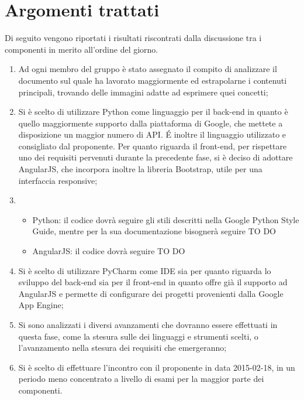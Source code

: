 %



\section{Argomenti trattati} %
\label{sec:argomenti_trattati}
Di seguito vengono riportati i risultati riscontrati dalla discussione tra i componenti in merito all'ordine del giorno.
	\begin{enumerate}
		\item Ad ogni membro del gruppo è stato assegnato il compito di analizzare il documento sul quale ha lavorato maggiormente ed estrapolarne i contenuti principali, trovando delle immagini adatte ad esprimere quei concetti;
		\item Si è scelto di utilizzare Python come linguaggio per il back-end in quanto è quello maggiormente supporto dalla piattaforma di Google, che mettete a disposizione un maggior numero di API. \'E inoltre il linguaggio utilizzato e consigliato dal proponente. \newline
		Per quanto riguarda il front-end, per rispettare uno dei requisiti pervenuti durante la precedente fase, si è deciso di adottare AngularJS, che incorpora inoltre la libreria Bootstrap, utile per una interfaccia responsive;
		\item 
			\begin{itemize}
				\item Python: il codice dovrà seguire gli stili descritti nella Google Python Style Guide, mentre per la sua documentazione bisognerà seguire TO DO 
				\item AngularJS: il codice dovrà seguire TO DO
			\end{itemize}
		\item Si è scelto di utilizzare PyCharm come IDE sia per quanto riguarda lo sviluppo del back-end sia per il front-end in quanto offre già il supporto ad AngularJS e permette di configurare dei progetti provenienti dalla Google App Engine;
		\item Si sono analizzati i diversi avanzamenti che dovranno essere effettuati in questa fase, come la stesura sulle \docNameVersionNdP{} dei linguaggi e strumenti scelti, o l'avanzamento nella stesura dei requisiti che emergeranno;
		\item Si è scelto di effettuare l'incontro con il proponente in data 2015-02-18, in un periodo meno concentrato a livello di esami per la maggior parte dei componenti.
	\end{enumerate}
